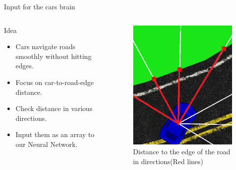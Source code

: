 \documentclass{do}
\begin{document}
\begin{frame}{Input for the cars brain}
    \begin{columns}
        \column{.6\textheight}
        \begin{block}{Idea}
            \begin{itemize}
                \item Cars navigate roads smoothly without hitting edges.
                \item Focus on car-to-road-edge distance.
                \item Check distance in various directions.
                \item Input them as an array to our Neural Network.
            \end{itemize} 
        \end{block}
        \column{.4\textheight}
         \begin{figure}
            \includegraphics[width=1.0\linewidth]{cardist.png}
            \caption{\tiny Distance to the edge of the road in directions(Red lines)}
        \end{figure}
    \end{columns}
\end{frame}
\end{document}
